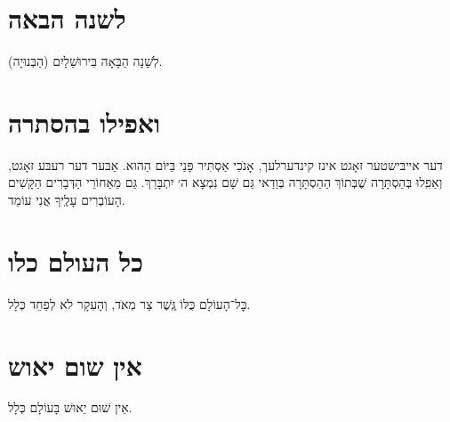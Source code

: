 \documentclass{songsheet}
\begin{document}
\section{לשנה הבאה}
לְשָׁנָה הַבָּאָה בִּירוּשַׁלָיִם (הַבְּנוּיָה).
\section{ואפילו בהסתרה}
דער אײבּישטער זאָגט אינז קינדערלעך, אָנֺכִי אַסְתִּיר פָּנַי בַּיּוֹם הַהוּא. אַבּער דער רעבּע זאָגט, וְאַפִֽלוּ בְּהַסְתָּרָה שֶׁבְּתוֹךְ הַהַסְתָּרָה בְּוַדַאי גַּם שָׁם נִמְצָא ה׳ יִתְבָּרֵךְ. גַּם מֵאַחוֹרֵי הַדְּבָרִים הַקָּשִׁים הָעוֹבְרִים עָלֶֽיךָ אֲנִי עוֹמֵד.
\section{כל העולם כלו}
כׇּל־הָעוֹלָם כֻּלּוֹ גֶּֽשֶׁר צַר מְאֺד, וְהָעִקָר לֺא לְפַחֵד כְּלָל.
\section{אין שום יאוש}
אֵין שׁוּם יֵאוּשׁ בָּעוֹלָם כְּלָל.
\end{document}
